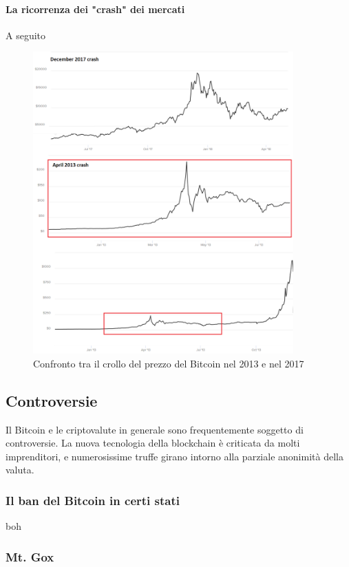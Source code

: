 \documentclass {article}
\begin{document}
{\paragraph {La ricorrenza dei "crash" dei mercati}


A seguito 

\vspace {0.5cm}
\begin{figure}[h]
\includegraphics [width = 10cm] {crash2.png}
\centering
\caption {Confronto tra il crollo del prezzo del Bitcoin nel 2013 e nel 2017}
\end{figure}
\vspace {0.2cm}
\noindent
%

\subsection {Controversie}


Il Bitcoin e le criptovalute in generale sono frequentemente soggetto di controversie. La nuova tecnologia della blockchain è criticata da molti imprenditori, e numerosissime truffe girano intorno alla parziale anonimità della valuta.


\subsubsection {Il ban del Bitcoin in certi stati}


boh


\subsubsection {Mt. Gox}


}
\end{document}

